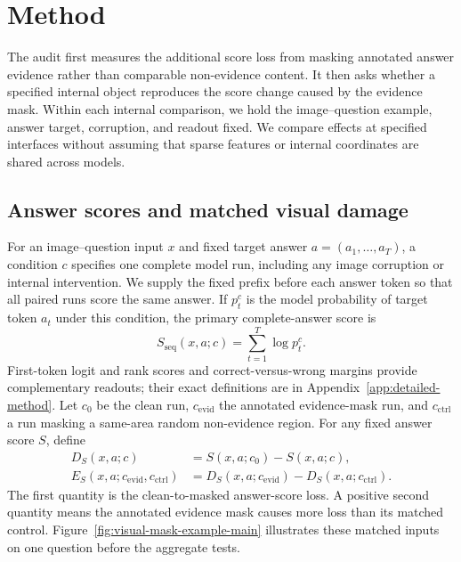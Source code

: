 \section{Method}
\label{sec:method}

The audit first measures the additional score loss from masking annotated answer evidence rather than comparable non-evidence content. It then asks whether a specified internal object reproduces the score change caused by the evidence mask. Within each internal comparison, we hold the image--question example, answer target, corruption, and readout fixed. We compare effects at specified interfaces without assuming that sparse features or internal coordinates are shared across models.

\subsection{Answer scores and matched visual damage}

For an image--question input $x$ and fixed target answer $a=(a_1,\ldots,a_T)$, a condition $c$ specifies one complete model run, including any image corruption or internal intervention. We supply the fixed prefix before each answer token so that all paired runs score the same answer. If $p_t^c$ is the model probability of target token $a_t$ under this condition, the primary complete-answer score is
\begin{equation}
S_{\mathrm{seq}}(x,a;c)=\sum_{t=1}^{T}\log p_t^c .
\label{eq:sequence-score}
\end{equation}
First-token logit and rank scores and correct-versus-wrong margins provide complementary readouts; their exact definitions are in Appendix~\ref{app:detailed-method}. Let $c_0$ be the clean run, $c_{\mathrm{evid}}$ the annotated evidence-mask run, and $c_{\mathrm{ctrl}}$ a run masking a same-area random non-evidence region. For any fixed answer score $S$, define
\begin{align}
D_S(x,a;c)&=S(x,a;c_0)-S(x,a;c), \label{eq:corruption-damage}\\
E_S(x,a;c_{\mathrm{evid}},c_{\mathrm{ctrl}})
&=D_S(x,a;c_{\mathrm{evid}})-D_S(x,a;c_{\mathrm{ctrl}}).
\label{eq:evidence-control-contrast}
\end{align}
The first quantity is the clean-to-masked answer-score loss. A positive second quantity means the annotated evidence mask causes more loss than its matched control. Figure~\ref{fig:visual-mask-example-main} illustrates these matched inputs on one question before the aggregate tests.

